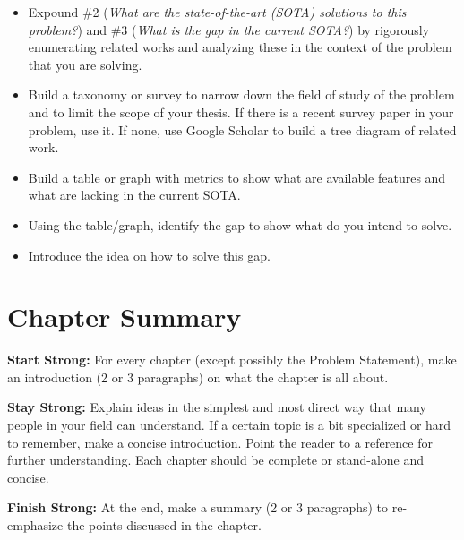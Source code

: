 \label{ch:related-work}

\begin{itemize}
    \item Expound \#2 (\emph{What are the state-of-the-art (SOTA) solutions to this problem?}) and \#3 (\emph{What is the gap in the current SOTA?}) by rigorously enumerating related works and analyzing these in the context of the problem that you are solving.
    \item Build a taxonomy or survey to narrow down the field of study of the problem and to limit the scope of your thesis. If there is a recent survey paper in your problem, use it. If none, use Google Scholar to build a tree diagram of related work.
    \item Build a table or graph with metrics to show what are available features and what are lacking in the current SOTA.
    \item Using the table/graph, identify the gap to show what do you intend to solve.
    \item Introduce the idea on how to solve this gap.
\end{itemize}

\section{Chapter Summary}

\textbf{Start Strong:} For every chapter (except possibly the Problem Statement), make an introduction (2 or 3 paragraphs) on what the chapter is all about.

\textbf{Stay Strong:} Explain ideas in the simplest and most direct way that many people in your field can understand. If a certain topic is a bit specialized or hard to remember, make a concise introduction. Point the reader to a reference for further understanding. Each chapter should be complete or stand-alone and concise.

\textbf{Finish Strong:} At the end, make a summary (2 or 3 paragraphs) to re-emphasize the points discussed in the chapter.
